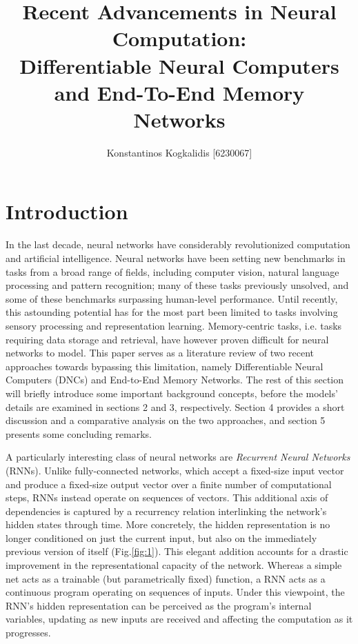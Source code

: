 \documentclass[]{article}
\begin{document}
\author{Konstantinos Kogkalidis [6230067]}
\title{Recent Advancements in Neural Computation: \\
\large Differentiable Neural Computers and End-To-End Memory Networks}
\maketitle

\section{Introduction}
In the last decade, neural networks have considerably revolutionized computation and artificial intelligence. Neural networks have been setting new benchmarks in tasks from a broad range of fields, including computer vision, natural language processing and pattern recognition; many of these tasks previously unsolved, and some of these benchmarks surpassing human-level performance. Until recently, this astounding potential has for the most part been limited to tasks involving sensory processing and representation learning. Memory-centric tasks, i.e. tasks requiring data storage and retrieval, have however proven difficult for neural networks to model. This paper serves as a literature review of two recent approaches towards bypassing this limitation, namely Differentiable Neural Computers (DNCs) and End-to-End Memory Networks. The rest of this section will briefly introduce some important background concepts, before the models' details are examined in sections 2 and 3, respectively. Section 4 provides a short discussion and a comparative analysis on the two approaches, and section 5 presents some concluding remarks.

A particularly interesting class of neural networks are \textit{Recurrent Neural Networks} (RNNs). Unlike fully-connected networks, which accept a fixed-size input vector and produce a fixed-size output vector over a finite number of computational steps, RNNs instead operate on sequences of vectors. This additional axis of dependencies is captured by a recurrency relation interlinking the network's hidden states through time. More concretely, the hidden representation is no longer conditioned on just the current input, but also on the immediately previous version of itself (Fig.\ref{fig:1}). This elegant addition accounts for a drastic improvement in the representational capacity of the network. Whereas a simple net acts as a trainable (but parametrically fixed) function, a RNN acts as a continuous program operating on sequences of inputs. Under this viewpoint, the RNN's hidden representation can be perceived as the program's internal variables, updating as new inputs are received and affecting the computation as it progresses.
\end{document}

